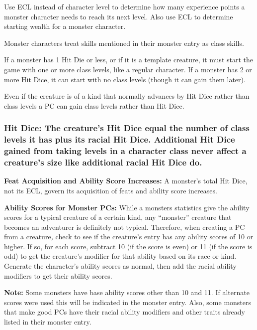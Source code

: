 \documentclass{article}
\begin{document}
Use ECL instead of character level\textit{ }to determine how many experience points 
a monster character needs to reach its next level. Also use ECL to determine starting 
wealth for a monster character.

Monster characters treat skills mentioned in their monster entry as class skills. 

If a monster has 1 Hit Die or less, or if it is a template creature, it must start 
the game with one or more class levels, like a regular character. If a monster 
has 2 or more Hit Dice, it can start with no class levels (though it can gain them 
later).

Even if the creature is of a kind that normally advances by Hit Dice rather than 
class levels a PC can gain class levels rather than Hit Dice.

\vspace{12pt}
\subsubsection*{\textbf{Hit Dice: }The creature's Hit Dice equal the number of 
class levels it has plus its racial Hit Dice. Additional Hit Dice gained from taking 
levels in a character class never affect a creature's size like additional racial 
Hit Dice do.}

\vspace{12pt}
\textbf{Feat Acquisition and Ability Score Increases:} A monster's total Hit Dice, 
not its ECL, govern its acquisition of feats and ability score increases. 

\vspace{12pt}
\textbf{Ability Scores for Monster PCs: }While a monsters statistics give the ability 
scores for a typical creature of a certain kind, any ``monster'' creature that 
becomes an adventurer is definitely not typical. Therefore, when creating a PC 
from a creature\textit{, }check to see if the creature's entry has any ability 
scores of 10 or higher. If so, for each score, subtract 10 (if the score is even) 
or 11 (if the score is odd) to get the creature's modifier for that ability based 
on its race or kind. Generate the character's ability scores as normal, then add 
the racial ability modifiers to get their ability scores. 

\textbf{Note:} Some monsters have base ability scores other than 10 and 11.  If 
alternate scores were used this will be indicated in the monster entry.  Also, 
some monsters that make good PCs have their racial ability modifiers and other 
traits already listed in their monster entry.
\end{document}
